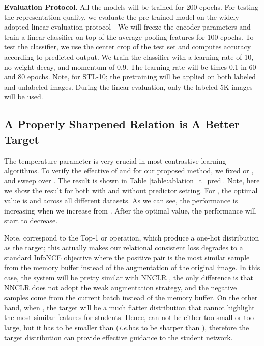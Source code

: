 \documentclass{article}
\newcommand{\<}{\left\langle}
\renewcommand{\>}{\right\rangle}
\newcommand{\ie}{{\emph{i.e.}}}
\begin{document}
\textbf{Evaluation Protocol}.
All the models will be trained for 200 epochs. For testing the representation quality, we evaluate the pre-trained model on the widely adopted linear evaluation protocol - We will freeze the encoder parameters and train a linear classifier on top of the average pooling features for 100 epochs. To test the classifier, we use the center crop of the test set and computes accuracy according to predicted output. We train the classifier with a learning rate of 10, no weight decay, and momentum of 0.9. The learning rate will be times 0.1 in 60 and 80 epochs. Note, for STL-10; the pretraining will be applied on both labeled and unlabeled images. During the linear evaluation, only the labeled 5K images will be used.







\subsection{A Properly Sharpened Relation is A Better Target}
The temperature parameter is very crucial in most contrastive learning algorithms. To verify the effective of  and  for our proposed method, we fixed  or , and sweep over . The result is shown in Table \ref{table:ablation_t_pred}. Note, here we show the result for both with and without predictor setting. For , the optimal value is  and  across all different datasets. As we can see, the performance is increasing when we increase  from . After the optimal value, the performance will start to decrease.

Note,  correspond to the Top-1 or  operation, which produce a one-hot distribution as the target; this actually makes our relational consistent loss degrades to a standard InfoNCE objective where the positive pair is the most similar sample from the memory buffer instead of the augmentation of the original image. In this case, the system will be pretty similar with NNCLR \cite{nnclr}, the only difference is that NNCLR does not adopt the weak augmentation strategy, and the negative samples come from the current batch instead of the memory buffer.  On the other hand, when , the target will be a much flatter distribution that cannot highlight the most similar features for students. Hence,  can not be either too small or too large, but it has to be smaller than  (\ie  has to be sharper than ), therefore the target distribution can provide effective guidance to the student network. 
\end{document}
